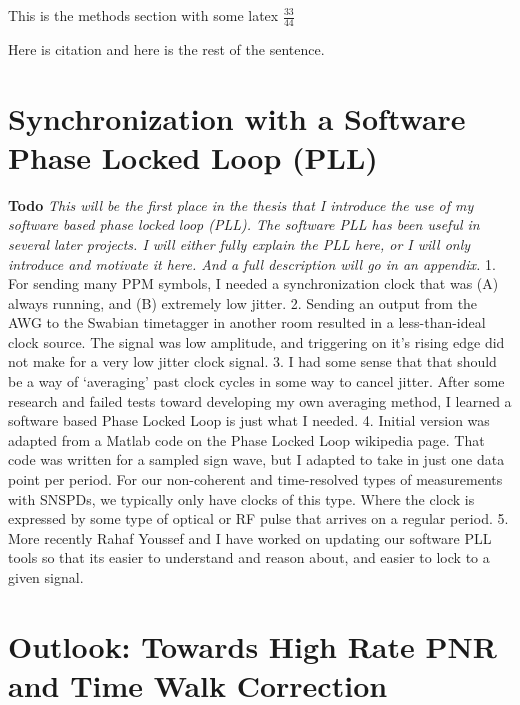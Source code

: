 \documentclass[11pt]{caltech_thesis} %
\begin{document}
This is the methods section with some latex \(\frac{33}{44}\)

Here is citation \autocite{Dolinar2011Photon} and here is the rest of
the sentence.

\hypertarget{synchronization-with-a-software-phase-locked-loop-pll}{%
\section{Synchronization with a Software Phase Locked Loop
(PLL)}\label{synchronization-with-a-software-phase-locked-loop-pll}}

\textbf{Todo} \emph{This will be the first place in the thesis that I
introduce the use of my software based phase locked loop (PLL). The
software PLL has been useful in several later projects. I will either
fully explain the PLL here, or I will only introduce and motivate it
here. And a full description will go in an appendix. } 1. For sending
many PPM symbols, I needed a synchronization clock that was (A) always
running, and (B) extremely low jitter. 2. Sending an output from the AWG
to the Swabian timetagger in another room resulted in a less-than-ideal
clock source. The signal was low amplitude, and triggering on it's
rising edge did not make for a very low jitter clock signal. 3. I had
some sense that that should be a way of `averaging' past clock cycles in
some way to cancel jitter. After some research and failed tests toward
developing my own averaging method, I learned a software based Phase
Locked Loop is just what I needed. 4. Initial version was adapted from a
Matlab code on the Phase Locked Loop wikipedia page. That code was
written for a sampled sign wave, but I adapted to take in just one data
point per period. For our non-coherent and time-resolved types of
measurements with SNSPDs, we typically only have clocks of this type.
Where the clock is expressed by some type of optical or RF pulse that
arrives on a regular period. 5. More recently Rahaf Youssef and I have
worked on updating our software PLL tools so that its easier to
understand and reason about, and easier to lock to a given signal.

\hypertarget{outlook-towards-high-rate-pnr-and-time-walk-correction}{%
\section{Outlook: Towards High Rate PNR and Time Walk
Correction}\label{outlook-towards-high-rate-pnr-and-time-walk-correction}}
\end{document}
